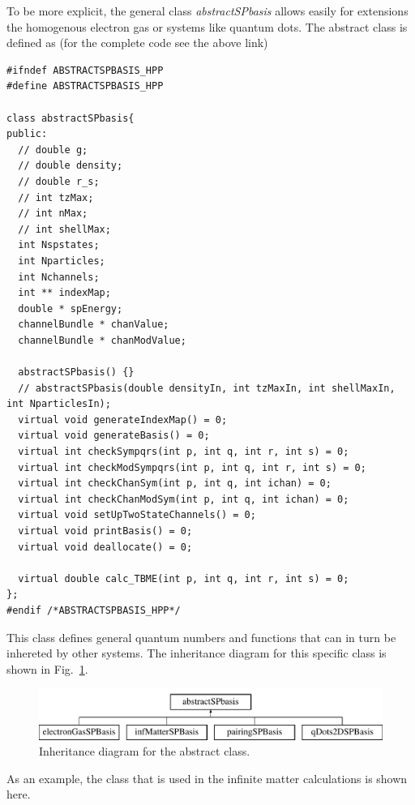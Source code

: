 To be more explicit, the general class  {\em abstractSPbasis} allows easily for extensions the homogenous electron gas or systems like quantum dots.  The abstract class is defined as (for the complete code see the above link)
\begin{lstlisting}
#ifndef ABSTRACTSPBASIS_HPP
#define ABSTRACTSPBASIS_HPP

class abstractSPbasis{
public:
  // double g;
  // double density;
  // double r_s;
  // int tzMax;
  // int nMax;
  // int shellMax;
  int Nspstates;
  int Nparticles;
  int Nchannels;
  int ** indexMap;
  double * spEnergy;
  channelBundle * chanValue;
  channelBundle * chanModValue;

  abstractSPbasis() {}
  // abstractSPbasis(double densityIn, int tzMaxIn, int shellMaxIn, int NparticlesIn);
  virtual void generateIndexMap() = 0;
  virtual void generateBasis() = 0;
  virtual int checkSympqrs(int p, int q, int r, int s) = 0;
  virtual int checkModSympqrs(int p, int q, int r, int s) = 0;
  virtual int checkChanSym(int p, int q, int ichan) = 0;  
  virtual int checkChanModSym(int p, int q, int ichan) = 0;  
  virtual void setUpTwoStateChannels() = 0;
  virtual void printBasis() = 0;
  virtual void deallocate() = 0;  

  virtual double calc_TBME(int p, int q, int r, int s) = 0;
};
#endif /*ABSTRACTSPBASIS_HPP*/
\end{lstlisting} 
This class defines general quantum numbers and functions that can in turn be inhereted by other systems.
The inheritance diagram for this specific class is shown in Fig.~\ref{fig:absinherit}.
\begin{figure}
\caption{Inheritance diagram for the abstract class.} \label{fig:absinherit}
\begin{center}
\includegraphics{Chapter8-figures/classabstractspbasis.pdf}
\end{center}
\end{figure}
As an example, the class that is used in the infinite matter calculations is shown here.
